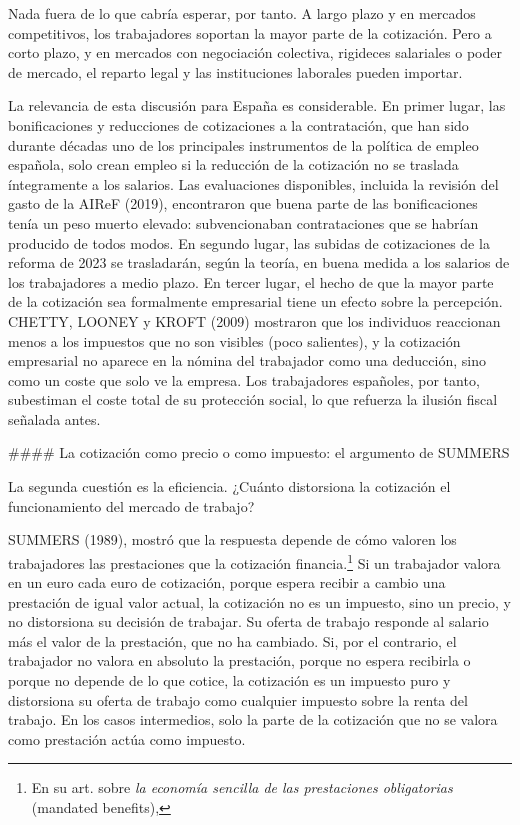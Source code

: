 \documentclass[10pt,a4paper]{article}
\begin{document}
Nada fuera de lo que cabría esperar, por tanto. A largo plazo y en mercados competitivos, los trabajadores soportan la mayor parte de la cotización. Pero a corto plazo, y en mercados con negociación colectiva, rigideces salariales o poder de mercado, el reparto legal y las instituciones laborales pueden importar.

La relevancia de esta discusión para España es considerable. En primer lugar, las bonificaciones y reducciones de cotizaciones a la contratación, que han sido durante décadas uno de los principales instrumentos de la política de empleo española, solo crean empleo si la reducción de la cotización no se traslada íntegramente a los salarios. Las evaluaciones disponibles, incluida la revisión del gasto de la AIReF (2019), encontraron que buena parte de las bonificaciones tenía un peso muerto elevado: subvencionaban contrataciones que se habrían producido de todos modos. En segundo lugar, las subidas de cotizaciones de la reforma de 2023 se trasladarán, según la teoría, en buena medida a los salarios de los trabajadores a medio plazo. En tercer lugar, el hecho de que la mayor parte de la cotización sea formalmente empresarial tiene un efecto sobre la percepción. CHETTY, LOONEY y KROFT (2009) mostraron que los individuos reaccionan menos a los impuestos que no son visibles (poco salientes), y la cotización empresarial no aparece en la nómina del trabajador como una deducción, sino como un coste que solo ve la empresa. Los trabajadores españoles, por tanto, subestiman el coste total de su protección social, lo que refuerza la ilusión fiscal señalada antes.

#### La cotización como precio o como impuesto: el argumento de SUMMERS

La segunda cuestión es la eficiencia. ¿Cuánto distorsiona la cotización el funcionamiento del mercado de trabajo?

SUMMERS (1989), mostró que la respuesta depende de cómo valoren los trabajadores las prestaciones que la cotización financia.\footnote{
En su art. sobre \textit{la economía sencilla de las prestaciones obligatorias} (mandated benefits),
} Si un trabajador valora en un euro cada euro de cotización, porque espera recibir a cambio una prestación de igual valor actual, la cotización no es un impuesto, sino un precio, y no distorsiona su decisión de trabajar. Su oferta de trabajo responde al salario más el valor de la prestación, que no ha cambiado. Si, por el contrario, el trabajador no valora en absoluto la prestación, porque no espera recibirla o porque no depende de lo que cotice, la cotización es un impuesto puro y distorsiona su oferta de trabajo como cualquier impuesto sobre la renta del trabajo. En los casos intermedios, solo la parte de la cotización que no se valora como prestación actúa como impuesto.
\end{document}
